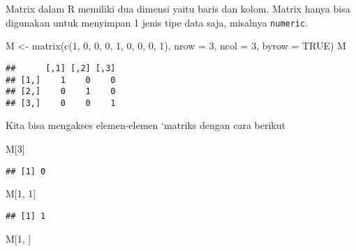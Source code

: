 \documentclass[
]{book}
\newenvironment{Shaded}{\begin{snugshade}}{\end{snugshade}}
\newcommand{\AttributeTok}[1]{\textcolor[rgb]{0.77,0.63,0.00}{#1}}
\newcommand{\ConstantTok}[1]{\textcolor[rgb]{0.00,0.00,0.00}{#1}}
\newcommand{\DecValTok}[1]{\textcolor[rgb]{0.00,0.00,0.81}{#1}}
\newcommand{\FunctionTok}[1]{\textcolor[rgb]{0.00,0.00,0.00}{#1}}
\newcommand{\NormalTok}[1]{#1}
\newcommand{\OtherTok}[1]{\textcolor[rgb]{0.56,0.35,0.01}{#1}}
\begin{document}
Matrix dalam R memiliki dua dimensi yaitu baris dan kolom. Matrix hanya bisa digunakan untuk menyimpan 1 jenis tipe data saja, misalnya \texttt{numeric}.

\begin{Shaded}
\begin{Highlighting}[]
\NormalTok{M }\OtherTok{\textless{}{-}} \FunctionTok{matrix}\NormalTok{(}\FunctionTok{c}\NormalTok{(}\DecValTok{1}\NormalTok{, }\DecValTok{0}\NormalTok{, }\DecValTok{0}\NormalTok{, }\DecValTok{0}\NormalTok{, }\DecValTok{1}\NormalTok{, }\DecValTok{0}\NormalTok{, }\DecValTok{0}\NormalTok{, }\DecValTok{0}\NormalTok{, }\DecValTok{1}\NormalTok{), }
        \AttributeTok{nrow =} \DecValTok{3}\NormalTok{, }\AttributeTok{ncol =} \DecValTok{3}\NormalTok{, }\AttributeTok{byrow =} \ConstantTok{TRUE}\NormalTok{)}
\NormalTok{M}
\end{Highlighting}
\end{Shaded}

\begin{verbatim}
##      [,1] [,2] [,3]
## [1,]    1    0    0
## [2,]    0    1    0
## [3,]    0    0    1
\end{verbatim}

Kita bisa mengakses elemen-elemen `matriks dengan cara berikut

\begin{Shaded}
\begin{Highlighting}[]
\NormalTok{M[}\DecValTok{3}\NormalTok{]}
\end{Highlighting}
\end{Shaded}

\begin{verbatim}
## [1] 0
\end{verbatim}

\begin{Shaded}
\begin{Highlighting}[]
\NormalTok{M[}\DecValTok{1}\NormalTok{, }\DecValTok{1}\NormalTok{]}
\end{Highlighting}
\end{Shaded}

\begin{verbatim}
## [1] 1
\end{verbatim}

\begin{Shaded}
\begin{Highlighting}[]
\NormalTok{M[}\DecValTok{1}\NormalTok{, ]}
\end{Highlighting}
\end{Shaded}
\end{document}
